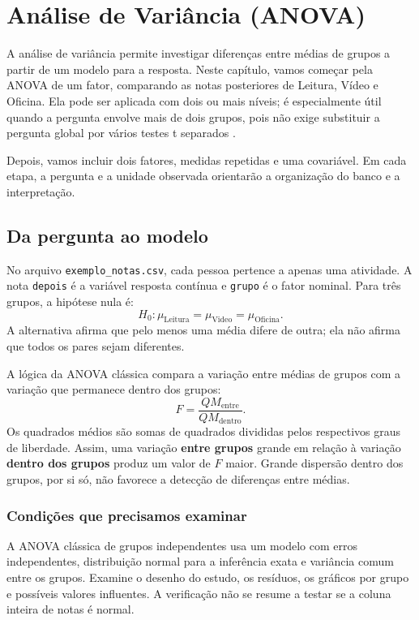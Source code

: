 \chapter{Análise de Variância (ANOVA)}
\label{cap:anova}

A análise de variância permite investigar diferenças entre médias de grupos a partir de um modelo para a resposta. Neste capítulo, vamos começar pela ANOVA de um fator, comparando as notas posteriores de Leitura, Vídeo e Oficina. Ela pode ser aplicada com dois ou mais níveis; é especialmente útil quando a pergunta envolve mais de dois grupos, pois não exige substituir a pergunta global por vários testes t separados \parencite{NISTAnova}.

Depois, vamos incluir dois fatores, medidas repetidas e uma covariável. Em cada etapa, a pergunta e a unidade observada orientarão a organização do banco e a interpretação.

\section{Da pergunta ao modelo}

No arquivo \texttt{exemplo\_notas.csv}, cada pessoa pertence a apenas uma atividade. A nota \texttt{depois} é a variável resposta contínua e \texttt{grupo} é o fator nominal. Para três grupos, a hipótese nula é:
\[
H_0:\mu_{\mathrm{Leitura}}=\mu_{\mathrm{Video}}=\mu_{\mathrm{Oficina}}.
\]
A alternativa afirma que pelo menos uma média difere de outra; ela não afirma que todos os pares sejam diferentes.

A lógica da ANOVA clássica compara a variação entre médias de grupos com a variação que permanece dentro dos grupos:
\[
F=\frac{QM_{\mathrm{entre}}}{QM_{\mathrm{dentro}}}.
\]
Os quadrados médios são somas de quadrados divididas pelos respectivos graus de liberdade. Assim, uma variação \textbf{entre grupos} grande em relação à variação \textbf{dentro dos grupos} produz um valor de $F$ maior. Grande dispersão dentro dos grupos, por si só, não favorece a detecção de diferenças entre médias.

\subsection{Condições que precisamos examinar}

A ANOVA clássica de grupos independentes usa um modelo com erros independentes, distribuição normal para a inferência exata e variância comum entre os grupos. Examine o desenho do estudo, os resíduos, os gráficos por grupo e possíveis valores influentes. A verificação não se resume a testar se a coluna inteira de notas é normal.

